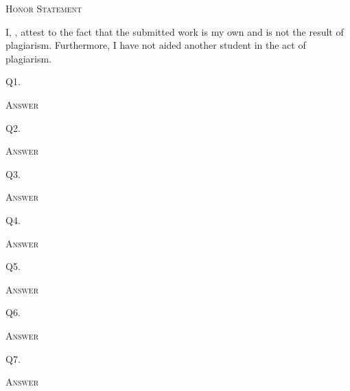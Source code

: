 



\begin{center}
  \textsc{Honor Statement}
\end{center}
I, ,
attest to the fact that the submitted work is my own and
is not the result of plagiarism.
Furthermore, I have not aided another student in the act of
plagiarism.



\newpage
Q1. 

\textsc{Answer}
\begin{answercode}

\end{answercode}




Q2. 

\textsc{Answer}
\begin{answercode}

\end{answercode}


\newpage
Q3. 

\textsc{Answer}
\begin{answercode}

\end{answercode}




Q4. 

\textsc{Answer}
\begin{answercode}

\end{answercode}


\newpage

Q5. 

\textsc{Answer}
\begin{answercode}

\end{answercode}


Q6. 

\textsc{Answer}
\begin{answercode}

\end{answercode}


\newpage

Q7. 

\textsc{Answer}
\begin{answercode}

\end{answercode}




